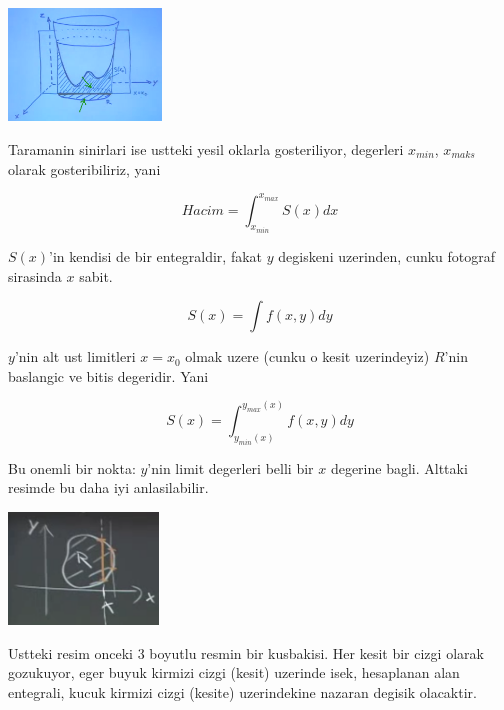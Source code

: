 \documentclass[12pt,fleqn]{article}
\begin{document}
\includegraphics[height=3cm]{16_6.png}

Taramanin sinirlari ise ustteki yesil oklarla gosteriliyor, degerleri
$x_{min}$, $x_{maks}$ olarak gosteribiliriz, yani

\[ Hacim = \int_{x_{min}}^{x_{max}} S(x) dx \]

$S(x)$'in kendisi de bir entegraldir, fakat $y$ degiskeni uzerinden, cunku
fotograf sirasinda $x$ sabit. 

\[ S(x) = \int f(x,y) dy \]

$y$'nin alt ust limitleri $x=x_0$ olmak uzere (cunku o kesit uzerindeyiz)
$R$'nin baslangic ve bitis degeridir. Yani

\[ S(x) = \int_{y_{min}(x)}^{y_{max}(x)} f(x,y) dy \]

Bu onemli bir nokta: $y$'nin limit degerleri belli bir $x$ degerine
bagli. Alttaki resimde bu daha iyi anlasilabilir. 

\includegraphics[height=3cm]{16_7.png}

Ustteki resim onceki 3 boyutlu resmin bir kusbakisi. Her kesit bir cizgi
olarak gozukuyor, eger buyuk kirmizi cizgi (kesit) uzerinde isek,
hesaplanan alan entegrali, kucuk kirmizi cizgi (kesite) uzerindekine
nazaran degisik olacaktir.
\end{document}
